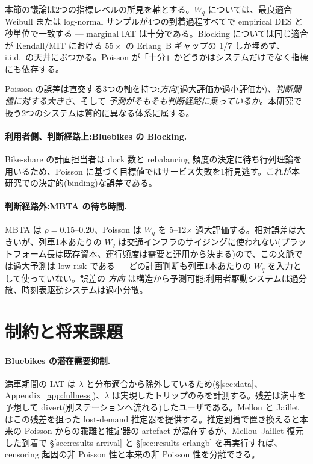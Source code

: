 本節の議論は2つの指標レベルの所見を軸とする。$W_q$ については、最良適合 Weibull または log-normal サンプルが4つの到着過程すべてで empirical DES と秒単位で一致する — marginal IAT は十分である。Blocking については同じ適合が Kendall/MIT における $55\times$ の Erlang~B ギャップの 1/7 しか埋めず、i.i.d.\ の天井にぶつかる。Poisson が「十分」かどうかはシステムだけでなく指標にも依存する。

Poisson の誤差は直交する3つの軸を持つ:\emph{方向}(過大評価か過小評価か)、\emph{判断閾値に対する大きさ}、そして \emph{予測がそもそも判断経路に乗っているか}。本研究で扱う2つのシステムは質的に異なる体系に属する。

\paragraph{利用者側、判断経路上:Bluebikes の Blocking.} Bike-share の計画担当者は dock 数と rebalancing 頻度の決定に待ち行列理論を用いるため、Poisson に基づく目標値ではサービス失敗を1桁見逃す。これが本研究での決定的(binding)な誤差である。

\paragraph{判断経路外:MBTA の待ち時間.} MBTA は $\rho = 0.15$--$0.20$、Poisson は $W_q$ を 5--12$\times$ 過大評価する。相対誤差は大きいが、列車1本あたりの $W_q$ は交通インフラのサイジングに使われない(プラットフォーム長は既存資本、運行頻度は需要と運用から決まる)ので、この文脈では過大予測は low-risk である — どの計画判断も列車1本あたりの $W_q$ を入力として使っていない。誤差の \emph{方向} は構造から予測可能:利用者駆動システムは過分散、時刻表駆動システムは過小分散。

\section{制約と将来課題}\label{sec:limitations}

\paragraph{Bluebikes の潜在需要抑制.} 満車期間の IAT は $\lambda$ と分布適合から除外しているため(\S\ref{sec:data}、Appendix~\ref{app:fullness})、$\lambda$ は実現したトリップのみを計測する。残差は満車を予想して divert(別ステーションへ流れる)したユーザである。Mellou と Jaillet~\cite{mellou2019} はこの残差を狙った lost-demand 推定器を提供する。推定到着で置き換えると本来の Poisson からの乖離と推定器の artefact が混在するが、Mellou--Jaillet 復元した到着で \S\ref{sec:results-arrival} と \S\ref{sec:results-erlangb} を再実行すれば、censoring 起因の非 Poisson 性と本来の非 Poisson 性を分離できる。

